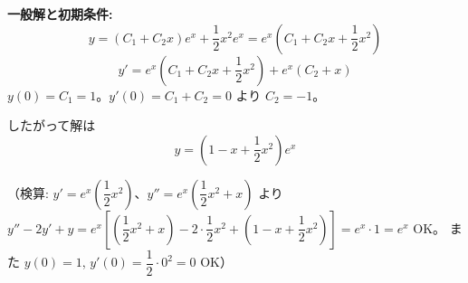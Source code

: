 \documentclass[a4paper,11pt]{article}
\begin{document}
\noindent
\textbf{一般解と初期条件:}
\[
y = (C_{1}+C_{2}x)e^{x} + \frac{1}{2}x^{2}e^{x} = e^{x}\left(C_{1} + C_{2}x + \frac{1}{2}x^{2}\right)
\]
\[
y' = e^{x}\left(C_{1} + C_{2}x + \frac{1}{2}x^{2}\right) + e^{x}(C_{2}+x)
\]
$y(0) = C_{1} = 1$。$y'(0) = C_{1}+C_{2} = 0$ より $C_{2} = -1$。

\noindent
したがって解は
\[
\boxed{\; y = \left(1 - x + \frac{1}{2}x^{2}\right)e^{x} \;}
\]

（検算: $y' = e^x\left(\dfrac{1}{2}x^2\right)$、$y'' = e^x\left(\dfrac{1}{2}x^2+x\right)$ より
$y''-2y'+y = e^x\left[\left(\dfrac{1}{2}x^2+x\right) - 2\cdot\dfrac{1}{2}x^2 + \left(1-x+\dfrac{1}{2}x^2\right)\right] = e^x\cdot 1 = e^x$ OK。
また $y(0)=1$, $y'(0)=\dfrac{1}{2}\cdot 0^2=0$ OK）
\end{document}
